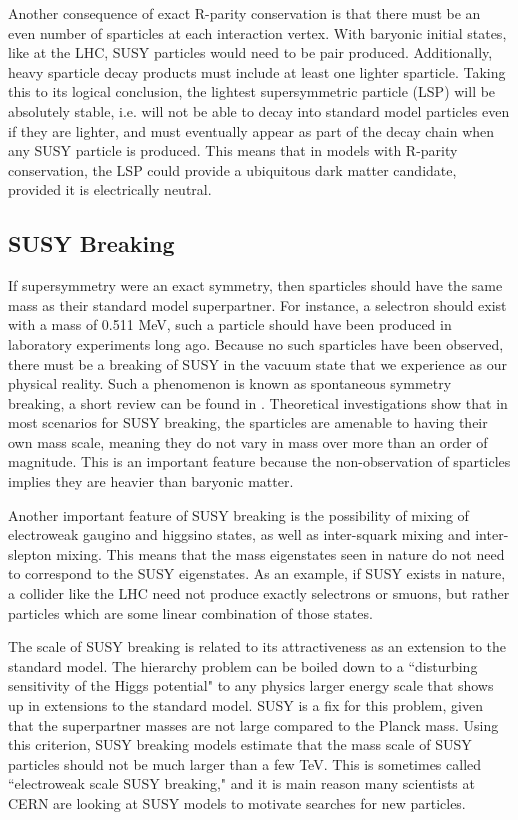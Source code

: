     Another consequence of exact R-parity conservation is that there must be an even number of sparticles at each interaction vertex. With baryonic initial states, like at the LHC, SUSY particles would need to be pair produced. Additionally, heavy sparticle decay products must include at least one lighter sparticle. Taking this to its logical conclusion, the lightest supersymmetric particle (LSP) will be absolutely stable, i.e. will not be able to decay into standard model particles even if they are lighter, and must eventually appear as part of the decay chain when any SUSY particle is produced. This means that in models with R-parity conservation, the LSP could provide a ubiquitous dark matter candidate, provided it is electrically neutral. \cite[sec. 6.2]{SUSY_Primer}

  \subsection{SUSY Breaking} \label{sec:susy_breaking}
    If supersymmetry were an exact symmetry, then sparticles should have the same mass as their standard model superpartner. For instance, a selectron should exist with a mass of 0.511 MeV, such a particle should have been produced in laboratory experiments long ago. Because no such sparticles have been observed, there must be a breaking of SUSY in the vacuum state that we experience as our physical reality. Such a phenomenon is known as spontaneous symmetry breaking, a short review can be found in \cite{symmetry_breaking}. Theoretical investigations show that in most scenarios for SUSY breaking, the sparticles are amenable to having their own mass scale, meaning they do not vary in mass over more than an order of magnitude. This is an important feature because the non-observation of sparticles implies they are heavier than baryonic matter. 

    Another important feature of SUSY breaking is the possibility of mixing of electroweak gaugino and higgsino states, as well as inter-squark mixing and inter-slepton mixing. This means that the mass eigenstates seen in nature do not need to correspond to the SUSY eigenstates. As an example, if SUSY exists in nature, a collider like the LHC need not produce exactly selectrons or smuons, but rather particles which are some linear combination of those states.

    The scale of SUSY breaking is related to its attractiveness as an extension to the standard model. The hierarchy problem can be boiled down to a ``disturbing sensitivity of the Higgs potential" to any physics larger energy scale that shows up in extensions to the standard model. SUSY is a fix for this problem, given that the superpartner masses are not large compared to the Planck mass.\cite[pg. 11]{SUSY_Primer} Using this criterion, SUSY breaking models estimate that the mass scale of SUSY particles should not be much larger than a few TeV. This is sometimes called ``electroweak scale SUSY breaking," and it is main reason many scientists at CERN are looking at SUSY models to motivate searches for new particles.

